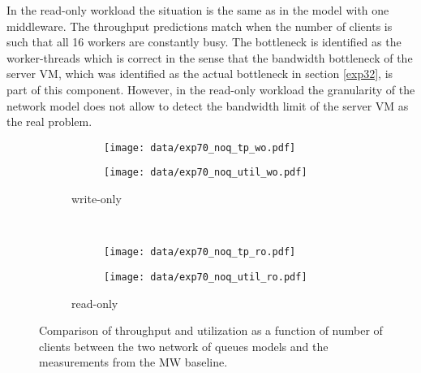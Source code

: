 \documentclass[report.tex]{subfiles}
\begin{document}
In the read-only workload the situation is the same as in the model with one middleware. The throughput predictions match when the number of clients is such that all 16 workers are constantly busy. The bottleneck is identified as the worker-threads which is correct in the sense that the bandwidth bottleneck of the server VM, which was identified as the actual bottleneck in section \ref{exp32}, is part of this component.
However, in the read-only workload the granularity of the network model does not allow to detect the bandwidth limit of the server VM as the real problem. 

\begin{figure}[H]
\begin{subfigure}{\linewidth}
	\begin{subfigure}[b]{.49\linewidth}
		\centering
		\texttt{[image: data/exp70\_noq\_tp\_wo.pdf]}
	\end{subfigure}\hfill
	\begin{subfigure}[b]{.49\linewidth}
		\centering
		\texttt{[image: data/exp70\_noq\_util\_wo.pdf]}
	\end{subfigure}%
	\caption{write-only}\label{exp70_noq_wo}
\end{subfigure}
\\[1ex]
\begin{subfigure}{\linewidth}
	\begin{subfigure}[b]{.49\linewidth}
		\centering
		\texttt{[image: data/exp70\_noq\_tp\_ro.pdf]}
	\end{subfigure}\hfill
	\begin{subfigure}[b]{.49\linewidth}
		\centering
		\texttt{[image: data/exp70\_noq\_util\_ro.pdf]}
	\end{subfigure}%
	\caption{read-only}\label{exp70_noq_ro}
\end{subfigure}
\caption{Comparison of throughput and utilization as a function of number of clients between the two network of queues models and the measurements from the MW baseline.}
\end{figure}
\end{document}
